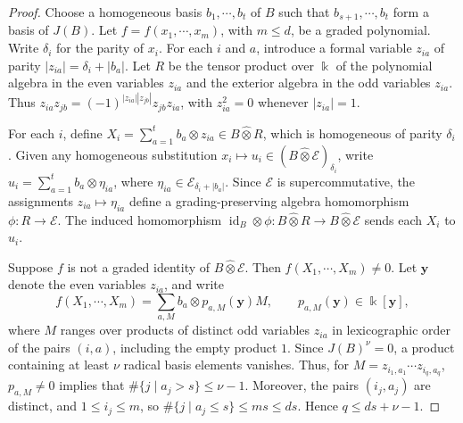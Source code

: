 \documentclass[11pt,reqno]{amsart}
\newcommand{\kk}{\Bbbk}
\newcommand{\E}{\mathcal E}
\theoremstyle{definition}
\theoremstyle{remark}
\numberwithin{equation}{section}
\begin{document}
\begin{proof}

Choose a homogeneous basis $b_1,\cdots,b_t$ of $B$ such that
$b_{s+1},\cdots,b_t$ form a basis of $J(B)$.
Let $f=f(x_1,\cdots,x_m)$, with $m\leq d$, be a graded
polynomial.
Write $\delta_i$ for the parity of $x_i$.
For each $i$ and $a$, introduce a formal variable $z_{ia}$
of parity $|z_{ia}|=\delta_i+|b_a|$.
Let $R$ be the tensor product over $\kk$ of the polynomial
algebra in the even variables $z_{ia}$ and the exterior
algebra in the odd variables $z_{ia}$.
Thus 
$z_{ia}z_{jb}=(-1)^{|z_{ia}||z_{jb}|}z_{jb}z_{ia}$,
with $z_{ia}^2=0$ whenever $|z_{ia}|=1$.

For each $i$, define
$X_i=\sum_{a=1}^t b_a\otimes z_{ia}\in B\mathbin{\widehat{\otimes}} R$, which is homogeneous
of parity $\delta_i$.
Given any homogeneous substitution
$x_i\mapsto u_i\in(B\mathbin{\widehat{\otimes}}\E)_{\delta_i}$, write
$u_i=\sum_{a=1}^t b_a\otimes\eta_{ia}$, where
$\eta_{ia}\in\E_{\delta_i+|b_a|}$.
Since $\E$ is supercommutative, the assignments
$z_{ia}\mapsto\eta_{ia}$ define a grading-preserving algebra
homomorphism $\phi:R\to\E$.
The induced homomorphism
$\operatorname{id}_B\otimes\phi:B\mathbin{\widehat{\otimes}} R
\to B\mathbin{\widehat{\otimes}}\E$ sends each $X_i$ to $u_i$.

Suppose $f$ is not a graded identity of $B\mathbin{\widehat{\otimes}}\E$. Then $f(X_1,\cdots,X_m)\ne0$.
 Let $\mathbf y$
denote the even variables $z_{ia}$, and write
\[
f(X_1,\cdots,X_m)
=
\sum_{a,M} b_a\otimes p_{a,M}(\mathbf y)M,
\qquad p_{a,M}(\mathbf y)\in\kk[\mathbf y],
\]
where $M$ ranges over products of distinct odd variables
$z_{ia}$ in lexicographic order of the pairs $(i,a)$, including the empty product $1$.
Since $J(B)^\nu=0$, a product containing at least $\nu$ radical basis elements vanishes.
Thus, for $M=z_{i_1,a_1}\cdots z_{i_q,a_q}$,
$
p_{a,M}\ne0$ implies that $
\#\{j\mid a_j>s\}\leq\nu-1$.
Moreover, the pairs $(i_j,a_j)$ are distinct, and
$1\leq i_j\leq m$, so
$
\#\{j\mid a_j\leq s\}\leq ms\leq ds$.
Hence $q\leq ds+\nu-1$.


\end{proof}
\end{document}
